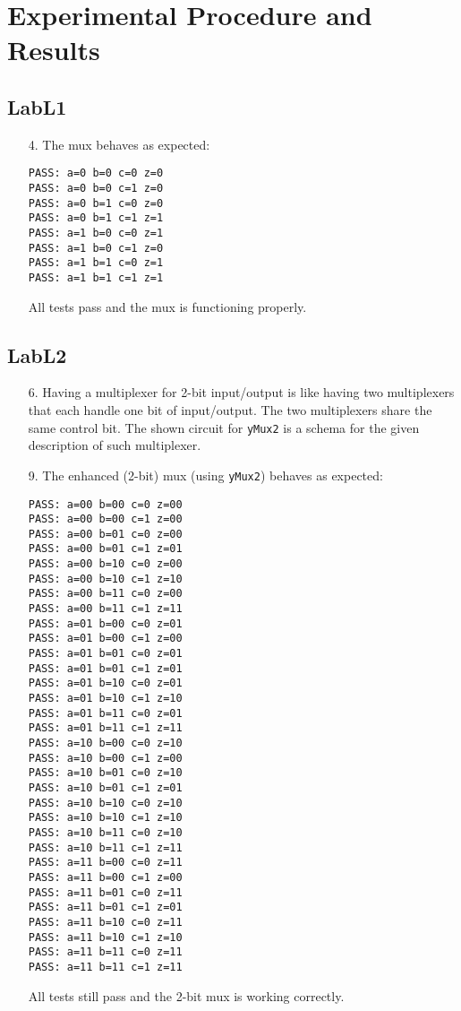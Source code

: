 \documentclass{article}
\begin{document}
\section{Experimental Procedure and Results}

\subsection{LabL1}
\begin{enumerate}
\item[4. ] The mux behaves as expected:
\begin{verbatim}
PASS: a=0 b=0 c=0 z=0
PASS: a=0 b=0 c=1 z=0
PASS: a=0 b=1 c=0 z=0
PASS: a=0 b=1 c=1 z=1
PASS: a=1 b=0 c=0 z=1
PASS: a=1 b=0 c=1 z=0
PASS: a=1 b=1 c=0 z=1
PASS: a=1 b=1 c=1 z=1
\end{verbatim}

  All tests pass and the mux is functioning properly.

\end{enumerate}

\subsection{LabL2}
\begin{enumerate}
\item[6. ] Having a multiplexer for 2-bit input/output is like having two
multiplexers that each handle one bit of input/output. The two multiplexers
share the same control bit. The shown circuit for \verb$yMux2$ is a schema
for the given description of such multiplexer.

\item[9. ] The enhanced (2-bit) mux (using \verb$yMux2$) behaves as expected:
\begin{verbatim}
PASS: a=00 b=00 c=0 z=00
PASS: a=00 b=00 c=1 z=00
PASS: a=00 b=01 c=0 z=00
PASS: a=00 b=01 c=1 z=01
PASS: a=00 b=10 c=0 z=00
PASS: a=00 b=10 c=1 z=10
PASS: a=00 b=11 c=0 z=00
PASS: a=00 b=11 c=1 z=11
PASS: a=01 b=00 c=0 z=01
PASS: a=01 b=00 c=1 z=00
PASS: a=01 b=01 c=0 z=01
PASS: a=01 b=01 c=1 z=01
PASS: a=01 b=10 c=0 z=01
PASS: a=01 b=10 c=1 z=10
PASS: a=01 b=11 c=0 z=01
PASS: a=01 b=11 c=1 z=11
PASS: a=10 b=00 c=0 z=10
PASS: a=10 b=00 c=1 z=00
PASS: a=10 b=01 c=0 z=10
PASS: a=10 b=01 c=1 z=01
PASS: a=10 b=10 c=0 z=10
PASS: a=10 b=10 c=1 z=10
PASS: a=10 b=11 c=0 z=10
PASS: a=10 b=11 c=1 z=11
PASS: a=11 b=00 c=0 z=11
PASS: a=11 b=00 c=1 z=00
PASS: a=11 b=01 c=0 z=11
PASS: a=11 b=01 c=1 z=01
PASS: a=11 b=10 c=0 z=11
PASS: a=11 b=10 c=1 z=10
PASS: a=11 b=11 c=0 z=11
PASS: a=11 b=11 c=1 z=11
\end{verbatim}

  All tests still pass and the 2-bit mux is working correctly.

\end{enumerate}
\end{document}

